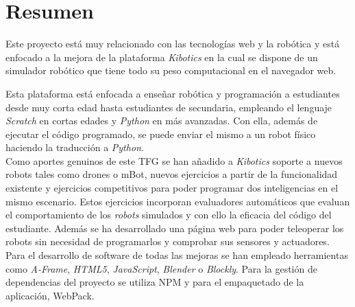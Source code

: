 \chapter*{Resumen}

     Este proyecto está muy relacionado con las tecnologías web y la robótica y está enfocado a la mejora de la plataforma \emph{Kibotics} en la cual se dispone de un simulador robótico que tiene todo su peso computacional en el navegador web. 
       
    Esta plataforma está enfocada a enseñar robótica y programación a estudiantes desde muy corta edad hasta estudiantes de secundaria, empleando el lenguaje \emph{Scratch} en cortas edades y \emph{Python} en más avanzadas. Con ella, además de ejecutar el código programado, se puede enviar el mismo a un robot físico haciendo la traducción a \emph{Python}. \\
    
    
    Como aportes genuinos de este TFG se han añadido a \textit{Kibotics} soporte a nuevos robots tales como drones o mBot, nuevos ejercicios a partir de la funcionalidad existente y ejercicios competitivos para poder programar dos inteligencias en el mismo escenario. Estos ejercicios incorporan evaluadores automáticos que evaluan el comportamiento de los \textit{robots} simulados y con ello la eficacia del código del estudiante. Además se ha desarrollado una página web para poder teleoperar los robots sin necesidad de programarlos y comprobar sus sensores y actuadores. \\
    
    
    Para el desarrollo de software de todas las mejoras se han empleado herramientas como \textit{A-Frame}, \textit{HTML5}, \textit{JavaScript}, \textit{Blender} o \textit{Blockly}. Para la gestión de dependencias del proyecto se utiliza NPM y para el empaquetado de la aplicación, WebPack.